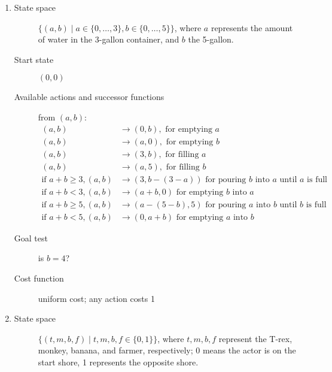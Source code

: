 \documentclass[11pt]{amsart}
\begin{document}
\begin{enumerate}
\begin{description}
\end{description}

\item

\begin{description}

\item[State space] $\{(a,b) \mid a \in \{0, \dots, 3\}, b \in \{0, \dots, 5\} \}$, where $a$ represents the amount of water in the 3-gallon container, and $b$ the 5-gallon.

\item[Start state] $(0, 0)$

\item[Available actions and successor functions] from $(a, b)$:
\begin{align*}
	(a, b) &\rightarrow (0, b), \text{ for emptying $a$} \\
	(a, b) &\rightarrow (a, 0), \text{ for emptying $b$} \\
	(a, b) &\rightarrow (3, b), \text{ for filling $a$} \\
	(a, b) &\rightarrow (a, 5), \text{ for filling $b$} \\
	\text{if $a + b \geq 3$}, (a, b) &\rightarrow (3, b - (3 - a)) \text{ for pouring $b$ into $a$ until $a$ is full} \\
	\text{if $a + b < 3$}, (a, b) &\rightarrow (a+b, 0) \text{ for emptying $b$ into $a$} \\
	\text{if $a + b \geq 5$}, (a, b) &\rightarrow (a - (5 - b), 5) \text{ for pouring $a$ into $b$ until $b$ is full} \\
	\text{if $a + b < 5$}, (a, b) &\rightarrow (0, a+b) \text{ for emptying $a$ into $b$}
\end{align*}

\item[Goal test] is $b = 4$?

\item[Cost function] uniform cost; any action costs 1

\end{description}

\item

\begin{description}


\item[State space] $\{(t, m, b, f) \mid t, m, b, f \in \{0, 1\}\}$, where $t,
m, b, f$ represent the T-rex, monkey, banana, and farmer, respectively; 0 means the actor is on the
start shore, 1 represents the opposite shore.


\end{description}
\end{enumerate}
\end{document}
